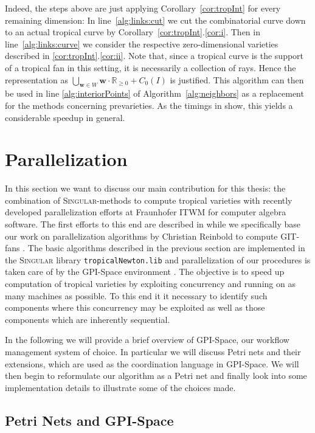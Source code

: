 \documentclass[
  paper=a4,
  titlepage,
  bibliography=totoc,
  pagesize=pdftex
]{scrartcl}
\numberwithin{figure}{section}
\numberwithin{equation}{section}
\numberwithin{table}{section}
\newcommand*\setR{\mathds{R}}
\let\vec\mathbf
\theoremstyle{definition}
\numberwithin{definition}{section}
\begin{document}
Indeed, the steps above are just applying Corollary~\ref{cor:tropInt} for every remaining
dimension: In line~\ref{alg:links:cut} we cut the combinatorial curve down to an actual
tropical curve by Corollary~\ref{cor:tropInt}.\ref{cor:i}. Then in
line~\ref{alg:links:curve} we consider the respective zero-dimensional varieties described
in \ref{cor:tropInt}.\ref{cor:ii}. Note that, since a tropical curve is the support of a
tropical fan in this setting, it is necessarily a collection of rays. Hence the
representation as $\bigcup_{\vec w \in W} \vec w\cdot \setR_{\geq0} + C_0(I)$ is
justified. This algorithm can then be used in line \ref{alg:interiorPoints} of
Algorithm~\ref{alg:neighbors} as a replacement for the methods concerning prevarieties. As
the timings in \cite{tropPointsLinks} show, this yields a considerable speedup in general.

\section{Parallelization}

In this section we want to discuss our main contribution for this thesis: the combination
of \textsc{Singular}-methods to compute tropical varieties with recently developed
parallelization efforts at Fraunhofer ITWM for computer algebra software. The first
efforts to this end are described in \cite{towardsParallel} while we specifically base our
work on parallelization algorithms by Christian Reinbold to compute GIT-fans
\cite{reinboldGitFan}. The basic algorithms described in the previous section are
implemented in the \textsc{Singular} library \texttt{tropicalNewton.lib}
\cite{tropNewtLib} and parallelization of our procedures is taken care of by the GPI-Space
environment \cite{gpispace}. The objective is to speed up computation of tropical
varieties by exploiting concurrency and running on as many machines as possible. To this
end it it necessary to identify such components where this concurrency may be exploited as
well as those components which are inherently sequential.

In the following we will provide a brief overview of GPI-Space, our workflow management
system of choice. In particular we will discuss Petri nets and their extensions, which are
used as the coordination language in GPI-Space. We will then begin to reformulate our
algorithm as a Petri net and finally look into some implementation details to illustrate
some of the choices made.

\subsection{Petri Nets and GPI-Space}
\end{document}
